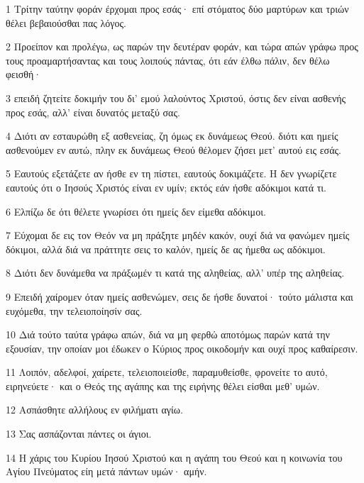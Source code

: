 \par 1 Τρίτην ταύτην φοράν έρχομαι προς εσάς· επί στόματος δύο μαρτύρων και τριών θέλει βεβαιούσθαι πας λόγος.
\par 2 Προείπον και προλέγω, ως παρών την δευτέραν φοράν, και τώρα απών γράφω προς τους προαμαρτήσαντας και τους λοιπούς πάντας, ότι εάν έλθω πάλιν, δεν θέλω φεισθή·
\par 3 επειδή ζητείτε δοκιμήν του δι' εμού λαλούντος Χριστού, όστις δεν είναι ασθενής προς εσάς, αλλ' είναι δυνατός μεταξύ σας.
\par 4 Διότι αν εσταυρώθη εξ ασθενείας, ζη όμως εκ δυνάμεως Θεού. διότι και ημείς ασθενούμεν εν αυτώ, πλην εκ δυνάμεως Θεού θέλομεν ζήσει μετ' αυτού εις εσάς.
\par 5 Εαυτούς εξετάζετε αν ήσθε εν τη πίστει, εαυτούς δοκιμάζετε. Η δεν γνωρίζετε εαυτούς ότι ο Ιησούς Χριστός είναι εν υμίν; εκτός εάν ήσθε αδόκιμοι κατά τι.
\par 6 Ελπίζω δε ότι θέλετε γνωρίσει ότι ημείς δεν είμεθα αδόκιμοι.
\par 7 Εύχομαι δε εις τον Θεόν να μη πράξητε μηδέν κακόν, ουχί διά να φανώμεν ημείς δόκιμοι, αλλά διά να πράττητε σεις το καλόν, ημείς δε ας ήμεθα ως αδόκιμοι.
\par 8 Διότι δεν δυνάμεθα να πράξωμέν τι κατά της αληθείας, αλλ' υπέρ της αληθείας.
\par 9 Επειδή χαίρομεν όταν ημείς ασθενώμεν, σεις δε ήσθε δυνατοί· τούτο μάλιστα και ευχόμεθα, την τελειοποίησίν σας.
\par 10 Διά τούτο ταύτα γράφω απών, διά να μη φερθώ αποτόμως παρών κατά την εξουσίαν, την οποίαν μοι έδωκεν ο Κύριος προς οικοδομήν και ουχί προς καθαίρεσιν.
\par 11 Λοιπόν, αδελφοί, χαίρετε, τελειοποιείσθε, παραμυθείσθε, φρονείτε το αυτό, ειρηνεύετε· και ο Θεός της αγάπης και της ειρήνης θέλει είσθαι μεθ' υμών.
\par 12 Ασπάσθητε αλλήλους εν φιλήματι αγίω.
\par 13 Σας ασπάζονται πάντες οι άγιοι.
\par 14 Η χάρις του Κυρίου Ιησού Χριστού και η αγάπη του Θεού και η κοινωνία του Αγίου Πνεύματος είη μετά πάντων υμών· αμήν.


